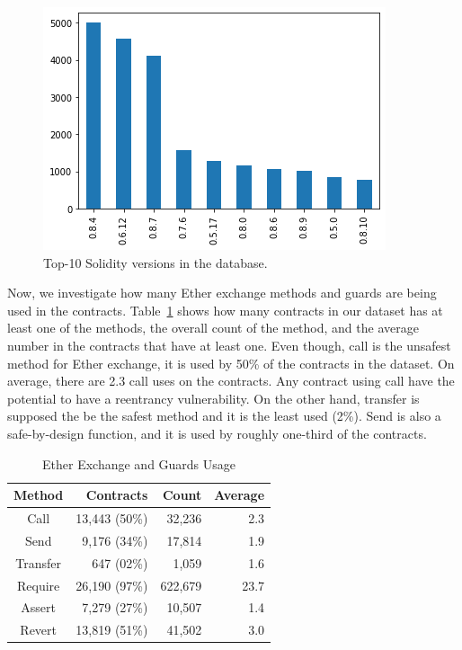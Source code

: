 \documentclass[10pt,conference]{IEEEtran}
\begin{document}
\begin{figure}[h]
  \centering
  \includegraphics[width=\linewidth]{img/versions_clean.png}
  \caption{Top-10 Solidity versions in the database.}
  \label{fig:minor-versions}
\end{figure}

Now, we investigate how many Ether exchange methods and guards are being used in the contracts. Table~\ref{tab:results-all} shows how many contracts in our dataset has at least one of the methods, the overall count of the method, and the average number in the contracts that have at least one.  Even though, call is the unsafest method for Ether exchange,  it is used by 50\% of the contracts in the dataset.  On average, there are 2.3 call uses on the contracts.  Any contract using call have the potential to have a reentrancy vulnerability.  On the other hand, transfer is supposed the be the safest method and it is the least used (2\%). Send is also a safe-by-design function, and it is used by roughly one-third of the contracts. 

\begin{table}
\center
  \caption{Ether Exchange and Guards Usage}
  \label{tab:results-all}
  \begin{tabular}{crrr}
    \hline
    Method & Contracts & Count & Average \\
    \hline
    Call & 13,443 (50\%) & 32,236 & 2.3 \\
    Send & 9,176 (34\%) & 17,814 & 1.9 \\
    Transfer & 647 (02\%) & 1,059& 1.6 \\
    Require & 26,190 (97\%) & 622,679 & 23.7 \\
    Assert & 7,279 (27\%) & 10,507 & 1.4 \\
    Revert & 13,819 (51\%) & 41,502 & 3.0\\
    \hline
\end{tabular}
\end{table}
\end{document}
